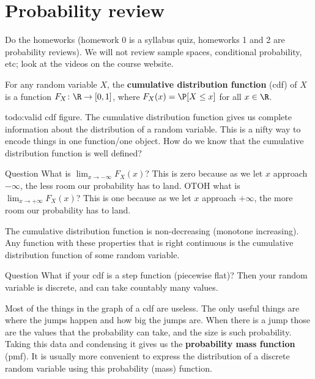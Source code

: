 \section{Probability review} 
Do the homeworks (homework 0 is a syllabus quiz, homeworks 1 and 2 are probability reviews). We will not review sample spaces, conditional probability, etc; look at the videos on the course website.
\begin{definition}
    For any random variable $X$, the \textbf{cumulative distribution function} (cdf) of $X$ is a function $F_X \colon \R \to [0,1] $, where $F_X (x) = \P[X \leq x]$ for all $x \in \R$.
\end{definition}
{\color{red}todo:valid cdf figure}. The cumulative distribution function gives us complete information about the distribution of a random variable. This is a nifty way to encode things in one function/one object. How do we know that the cumulative distribution function is well defined?
\begin{namedthing}{Question} 
    What is $\lim _{x \to - \infty}F_X(x)$? This is zero because as we let $x$ approach $- \infty$, the less room our probability has to land. OTOH what is $\lim _{x \to + \infty}F_X(x)$? This is one because as we let $x$ approach $+ \infty$, the more room our probability has to land.
\end{namedthing}
\begin{note}
    The cumulative distribution function is non-decreasing (monotone increasing). Any function with these properties that is right continuous is the cumulative distribution function of some random variable.
\end{note}
\begin{namedthing}{Question} 
    What if your cdf is a step function (piecewise flat)? Then your random variable is discrete, and can take countably many values.
\end{namedthing}
Most of the things in the graph of a cdf are useless. The only useful things are where the jumps happen and how big the jumps are. When there is a jump those are the values that the probability can take, and the size is such probability. Taking this data and condensing it gives us the \textbf{probability mass function} (pmf). It is usually more convenient to express the distribution of a discrete random variable using this probability (mass) function.


